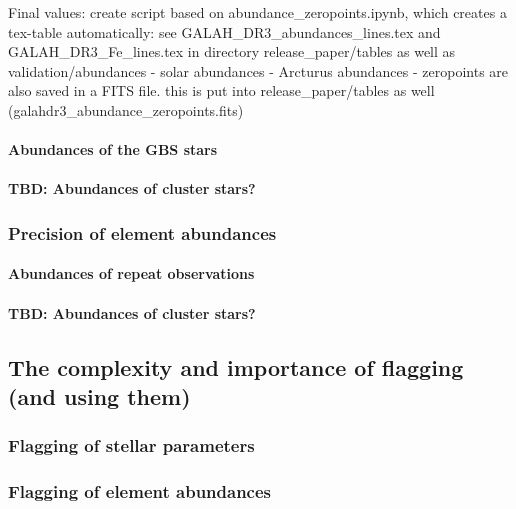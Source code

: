 \documentclass[fleqn,usenatbib,useAMS]{mnras}
\begin{document}
Final values: create script based on abundance_zeropoints.ipynb, which creates a tex-table automatically:
see GALAH_DR3_abundances_lines.tex and GALAH_DR3_Fe_lines.tex in directory release_paper/tables as well as validation/abundances
- solar abundances
- Arcturus abundances
- zeropoints are also saved in a FITS file. this is put into release_paper/tables as well (galahdr3_abundance_zeropoints.fits)

\paragraph*{Abundances of the GBS stars}

\paragraph*{TBD: Abundances of cluster stars?}

\subsubsection{Precision of element abundances}

\paragraph*{Abundances of repeat observations}

\paragraph*{TBD: Abundances of cluster stars?}

\subsection{The complexity and importance of flagging (and using them)}

\subsubsection{Flagging of stellar parameters}

\subsubsection{Flagging of element abundances}
\end{document}
